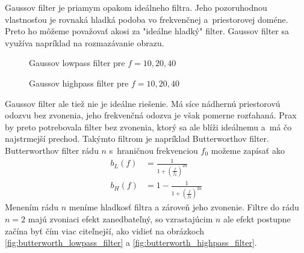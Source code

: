 Gaussov filter je priamym opakom ideálneho filtra. Jeho pozoruhodnou
vlastnosťou je rovnaká hladká podoba vo frekvenčnej a~priestorovej doméne.
Preto ho môžeme považovať akosi za "ideálne hladký" filter. Gaussov
filter sa využíva napríklad na rozmazávanie obrazu.

\begin{figure}[htp]
    \def\path{obrazky/informatika/digitalne_filtre}
    \centering
    \caption{Gaussov lowpass filter pre $f=10,20,40$}
    \label{fig:gauss_lowpass_filter}
\end{figure}

\begin{figure}[htp]
    \def\path{obrazky/informatika/digitalne_filtre}
    \centering
    \caption{Gaussov highpass filter pre $f=10,20,40$}
    \label{fig:gauss_highpass_filter}
\end{figure}

Gaussov filter ale tiež nie je ideálne riešenie. Má síce nádhernú
priestorovú odozvu bez zvonenia, jeho frekvenčná odozva je však
pomerne rozťahaná. Prax by preto potrebovala filter bez
zvonenia, ktorý sa ale blíži ideálnemu a~má čo najstrmejší prechod.
Takýmto filtrom je napríklad Butterworthov filter.
Butterworthov filter rádu $n$ s~hraničnou frekvenciou $f_0$
možeme zapísať ako
\begin{align*}
b_L(f) &=  \frac{1}{1 + (\frac{f}{f_0})^{2n}} \\
b_H(f) &= 1- \frac{1}{1 + (\frac{f}{f_0})^{2n}}
\end{align*}
Menením rádu $n$ meníme hladkosť filtra a zároveň jeho zvonenie.
Filtre do rádu $n=2$ majú zvoniaci efekt zanedbateľný, so vzrastajúcim
$n$ ale efekt postupne začína byť čím viac citeľnejší, ako vidieť na
obrázkoch \ref{fig:butterworth_lowpass_filter} a
\ref{fig:butterworth_highpass_filter}.

